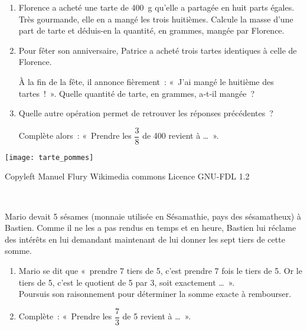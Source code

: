 \begin{activite}

\begin{minipage}[c]{0.7\linewidth}
\begin{partie}
\begin{enumerate}
 \item Florence a acheté une tarte de 400 g qu'elle a partagée en huit parts égales. Très gourmande, elle en a mangé les trois huitièmes. Calcule la masse d'une part de tarte et déduis-en la quantité, en grammes, mangée par Florence.
 \item Pour fêter son anniversaire, Patrice a acheté trois tartes identiques à celle de Florence.
 
À la fin de la fête, il annonce fièrement : « J'ai mangé le huitième des tartes ! ». Quelle quantité de tarte, en grammes, a‑t‑il mangée ?
 \item Quelle autre opération permet de retrouver les réponses précédentes ?
 
Complète alors : « Prendre les $\dfrac{3}{8}$ de 400 revient à \ldots ».
 \end{enumerate}
\end{partie}
\end{minipage} \hfill%
\begin{minipage}[c]{0.27\linewidth}
\begin{center} \texttt{[image: tarte\_pommes]} \end{center}
\begin{center} \quad \small{Copyleft Manuel Flury \newline \phantom{...} Wikimedia commons \newline \phantom{..} Licence GNU-FDL 1.2} \end{center}
\end{minipage} \\

\begin{partie}
Mario devait 5 sésames (monnaie utilisée en Sésamathie, pays des sésamatheux) à Bastien. 
Comme il ne les a pas rendus en temps et en heure, Bastien lui réclame des intérêts en lui demandant maintenant de lui donner les sept tiers de cette somme.
\begin{enumerate}
 \item Mario se dit que « prendre 7 tiers de 5, c'est prendre 7 fois le tiers de 5. Or le tiers de 5, c'est le quotient de 5 par 3, soit exactement \ldots ». \\[0.5em]
Poursuis son raisonnement pour déterminer la somme exacte à rembourser.
 \item Complète : « Prendre les $\dfrac{7}{3}$ de 5 revient à \ldots ».
 \end{enumerate}
\end{partie}

\end{activite}

